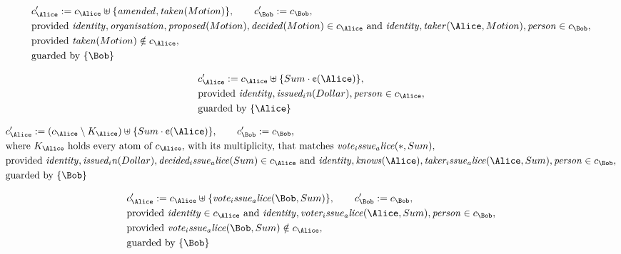 \begin{align*}
&
c'_
{
\Alice
}
 := 
c_
{
\Alice
}
 \uplus 
\{
\mathit{
amended
}
,
\mathit{
taken
}
(
Motion
)
\}
, \qquad 
c'_
{
\Bob
}
 := 
c_
{
\Bob
}
,\\
&
\text{provided } 
\mathit{
identity
}
,
\mathit{
organisation
}
,
\mathit{
proposed
}
(
Motion
)
,
\mathit{
decided
}
(
Motion
)
 \in c_
{
\Alice
}
 \text{ and } 
\mathit{
identity
}
,
\mathit{
taker
}
(
\Alice
,
Motion
)
,
\mathit{
person
}
 \in c_
{
\Bob
}
,\\
&
\text{provided } 
\mathit{
taken
}
(
Motion
)
 \notin c_
{
\Alice
}
,\\
&
\text{guarded by } \{
\Bob
\}
\end{align*}

\begin{align*}
&
c'_
{
\Alice
}
 := 
c_
{
\Alice
}
 \uplus 
\{
Sum
\cdot
\text{\textcent}
(
\Alice
)
\}
,\\
&
\text{provided } 
\mathit{
identity
}
,
\mathit{
issued_in
}
(
Dollar
)
,
\mathit{
person
}
 \in c_
{
\Alice
}
,\\
&
\text{guarded by } \{
\Alice
\}
\end{align*}

\begin{align*}
&
c'_
{
\Alice
}
 := 
(
c_
{
\Alice
}
 \setminus K_
{
\Alice
}
) \uplus 
\{
Sum
\cdot
\text{\textcent}
(
\Alice
)
\}
, \qquad 
c'_
{
\Bob
}
 := 
c_
{
\Bob
}
,\\
&
\text{where } K_
{
\Alice
}
 \text{ holds every atom of } c_
{
\Alice
}
 \text{, with its multiplicity, that matches } 
\mathit{
vote_issue_alice
}
(
\ast
,
Sum
)
,\\
&
\text{provided } 
\mathit{
identity
}
,
\mathit{
issued_in
}
(
Dollar
)
,
\mathit{
decided_issue_alice
}
(
Sum
)
 \in c_
{
\Alice
}
 \text{ and } 
\mathit{
identity
}
,
\mathit{
knows
}
(
\Alice
)
,
\mathit{
taker_issue_alice
}
(
\Alice
,
Sum
)
,
\mathit{
person
}
 \in c_
{
\Bob
}
,\\
&
\text{guarded by } \{
\Bob
\}
\end{align*}

\begin{align*}
&
c'_
{
\Alice
}
 := 
c_
{
\Alice
}
 \uplus 
\{
\mathit{
vote_issue_alice
}
(
\Bob
,
Sum
)
\}
, \qquad 
c'_
{
\Bob
}
 := 
c_
{
\Bob
}
,\\
&
\text{provided } 
\mathit{
identity
}
 \in c_
{
\Alice
}
 \text{ and } 
\mathit{
identity
}
,
\mathit{
voter_issue_alice
}
(
\Alice
,
Sum
)
,
\mathit{
person
}
 \in c_
{
\Bob
}
,\\
&
\text{provided } 
\mathit{
vote_issue_alice
}
(
\Bob
,
Sum
)
 \notin c_
{
\Alice
}
,\\
&
\text{guarded by } \{
\Bob
\}
\end{align*}
